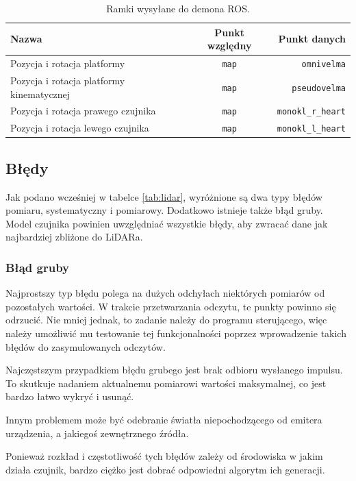 			\begin{table}
				\centering
				\begin{tabular}{l c r}
					Nazwa & Punkt względny & Punkt danych \\
					\hline
					Pozycja i rotacja platformy & \texttt{map} & \texttt{omnivelma} \\
					Pozycja i rotacja platformy kinematycznej & \texttt{map} & \texttt{pseudovelma} \\
					Pozycja i rotacja prawego czujnika & \texttt{map} & \texttt{monokl\_r\_heart} \\
					Pozycja i rotacja lewego czujnika & \texttt{map} & \texttt{monokl\_l\_heart} \\
				\end{tabular}
				\caption{Ramki wysyłane do demona ROS.}
				\label{tab:frame_send}
			\end{table}

	\subsection{Błędy}
		Jak podano wcześniej w tabelce \ref{tab:lidar}, wyróżnione są dwa typy błędów pomiaru, systematyczny i pomiarowy.
		Dodatkowo istnieje także błąd gruby.
		Model czujnika powinien uwzględniać wszystkie błędy, aby zwracać dane jak najbardziej zbliżone do LiDARa.

		\subsubsection{Błąd gruby}
			Najprostszy typ błędu polega na dużych odchyłach niektórych pomiarów od pozostałych wartości.
			W trakcie przetwarzania odczytu, te punkty powinno się odrzucić.
			Nie mniej jednak, to zadanie należy do programu sterującego, więc należy umożliwić mu testowanie tej funkcjonalności poprzez wprowadzenie takich błędów do zasymulowanych odczytów.

			Najczęstszym przypadkiem błędu grubego jest brak odbioru wysłanego impulsu. 
			To skutkuje nadaniem aktualnemu pomiarowi wartości maksymalnej, co jest bardzo łatwo wykryć i usunąć.

			Innym problemem może być odebranie światła niepochodzącego od emitera urządzenia, a jakiegoś zewnętrznego źródła.

			Ponieważ rozkład i częstotliwość tych błędów zależy od środowiska w jakim działa czujnik, bardzo ciężko jest dobrać odpowiedni algorytm ich generacji.

